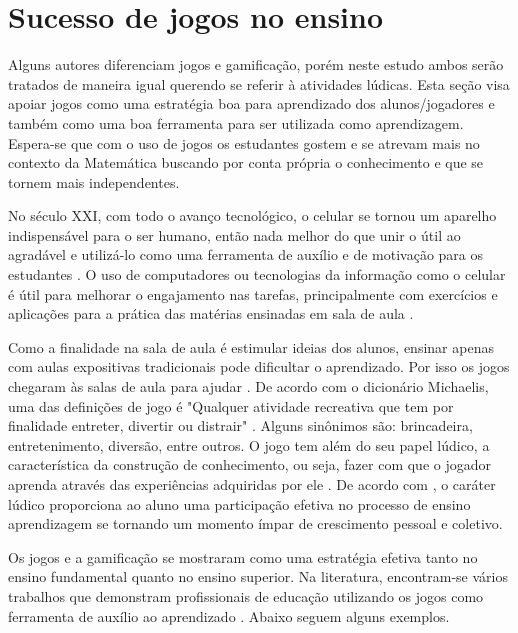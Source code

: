 
\section[Sucesso de jogos no ensino]{Sucesso de jogos no ensino}

Alguns autores diferenciam jogos e gamificação, porém neste estudo ambos serão tratados de maneira igual querendo se referir à atividades lúdicas. Esta seção visa apoiar jogos como uma estratégia boa para aprendizado dos alunos/jogadores e também como uma boa ferramenta para ser utilizada como aprendizagem. Espera-se que com o uso de jogos os estudantes gostem e se atrevam mais no contexto da Matemática buscando por conta própria o conhecimento e que se tornem mais independentes.

No século XXI, com todo o avanço tecnológico, o celular se tornou um aparelho indispensável para o ser humano, então nada melhor do que unir o útil ao agradável e utilizá-lo como uma ferramenta de auxílio e de motivação para os estudantes \cite{softwaregamificado}. O uso de computadores ou tecnologias da informação como o celular é útil para melhorar o engajamento nas tarefas, principalmente com exercícios e aplicações para a prática das matérias ensinadas em sala de aula \cite{tdahNasEscolas2}.

Como a finalidade na sala de aula é estimular ideias dos alunos, ensinar apenas com aulas expositivas tradicionais pode dificultar o aprendizado. Por isso os jogos chegaram às salas de aula para ajudar \cite[p. 4]{sucessoJogoEngSoft}. De acordo com o dicionário Michaelis, uma das definições de jogo é "Qualquer atividade recreativa que tem por finalidade entreter, divertir ou distrair" \cite{Michaelis}. Alguns sinônimos são: brincadeira, entretenimento, diversão, entre outros. O jogo tem além do seu papel lúdico, a característica da construção de conhecimento, ou seja, fazer com que o jogador aprenda através das experiências adquiridas por ele \cite{jogoPratPedagoc} \cite{appcalculo} \cite{Nunes} \cite{fukusawa}. De acordo com \cite{jogoPratPedagoc}, o caráter lúdico proporciona ao aluno uma participação efetiva no processo de ensino aprendizagem se tornando um momento ímpar de crescimento pessoal e coletivo. 

Os jogos e a gamificação se mostraram como uma estratégia efetiva tanto no ensino fundamental quanto no ensino superior. Na literatura, encontram-se vários trabalhos que demonstram profissionais de educação utilizando os jogos como ferramenta de auxílio ao aprendizado \cite[p. 3]{sucessoJogoEngSoft}. Abaixo seguem alguns exemplos.

